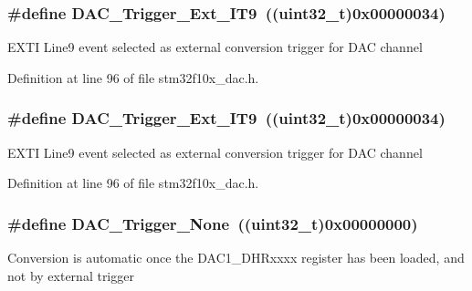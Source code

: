 \subsubsection[{\texorpdfstring{D\+A\+C\+\_\+\+Trigger\+\_\+\+Ext\+\_\+\+I\+T9}{DAC_Trigger_Ext_IT9}}]{\setlength{\rightskip}{0pt plus 5cm}\#define D\+A\+C\+\_\+\+Trigger\+\_\+\+Ext\+\_\+\+I\+T9~(({\bf uint32\+\_\+t})0x00000034)}\hypertarget{group___d_a_c__trigger__selection_ga67c15b2c26246a2304f9db28e25adcc4}{}\label{group___d_a_c__trigger__selection_ga67c15b2c26246a2304f9db28e25adcc4}
E\+X\+TI Line9 event selected as external conversion trigger for D\+AC channel 

Definition at line 96 of file stm32f10x\+\_\+dac.\+h.

\subsubsection[{\texorpdfstring{D\+A\+C\+\_\+\+Trigger\+\_\+\+Ext\+\_\+\+I\+T9}{DAC_Trigger_Ext_IT9}}]{\setlength{\rightskip}{0pt plus 5cm}\#define D\+A\+C\+\_\+\+Trigger\+\_\+\+Ext\+\_\+\+I\+T9~(({\bf uint32\+\_\+t})0x00000034)}\hypertarget{group___d_a_c__trigger__selection_ga67c15b2c26246a2304f9db28e25adcc4}{}\label{group___d_a_c__trigger__selection_ga67c15b2c26246a2304f9db28e25adcc4}
E\+X\+TI Line9 event selected as external conversion trigger for D\+AC channel 

Definition at line 96 of file stm32f10x\+\_\+dac.\+h.

\subsubsection[{\texorpdfstring{D\+A\+C\+\_\+\+Trigger\+\_\+\+None}{DAC_Trigger_None}}]{\setlength{\rightskip}{0pt plus 5cm}\#define D\+A\+C\+\_\+\+Trigger\+\_\+\+None~(({\bf uint32\+\_\+t})0x00000000)}\hypertarget{group___d_a_c__trigger__selection_ga7849138e043267668d755390d923e4ba}{}\label{group___d_a_c__trigger__selection_ga7849138e043267668d755390d923e4ba}
Conversion is automatic once the D\+A\+C1\+\_\+\+D\+H\+Rxxxx register has been loaded, and not by external trigger 

